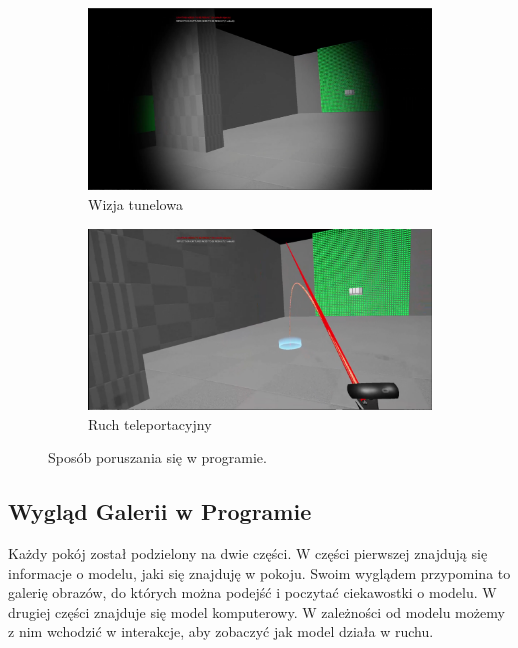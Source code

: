 \documentclass[a4paper,12pt,reqno]{article}
\begin{document}
\begin{figure}[!ht]%
	\centering
	\begin{subfigure}{.8\textwidth}
		\centering
		\includegraphics[width=0.8\linewidth]{graphics/tunnelvisionUE4.png}
		\caption{Wizja tunelowa}	
		\label{ref:subref_a}
	\end{subfigure}%

	\begin{subfigure}{.8\textwidth}
		\centering
		\includegraphics[width=0.8\linewidth]{graphics/teleportmoveUE4.png}
		\caption{Ruch teleportacyjny}	
		\label{ref:subref_c}
	\end{subfigure}%

\caption{Sposób poruszania się w programie.}
\label{ref:ref}
\end{figure}



\newpage
\subsection{Wygląd Galerii w Programie}

Każdy pokój został podzielony na dwie części. W części pierwszej znajdują się informacje o modelu, jaki się znajduję w pokoju. Swoim wyglądem przypomina to galerię obrazów, do których można podejść i poczytać ciekawostki o modelu. W drugiej części znajduje się model komputerowy. W zależności od modelu możemy z nim wchodzić w interakcje, aby zobaczyć jak model działa w ruchu.
\end{document}
